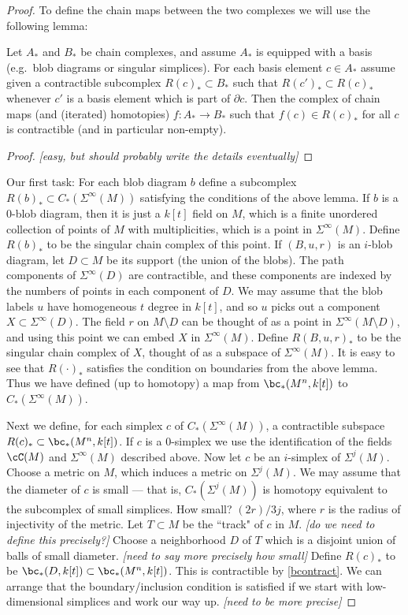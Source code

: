 \documentclass[11pt,leqno]{amsart}
\def\bd{\partial}
\def\sub{\subset}
\def\nn#1{{{\it \small [#1]}}}
\begin{document}
\begin{proof}
To define the chain maps between the two complexes we will use the following lemma:

\begin{lemma}
Let $A_*$ and $B_*$ be chain complexes, and assume $A_*$ is equipped with
a basis (e.g.\ blob diagrams or singular simplices).
For each basis element $c \in A_*$ assume given a contractible subcomplex $R(c)_* \sub B_*$
such that $R(c')_* \sub R(c)_*$ whenever $c'$ is a basis element which is part of $\bd c$.
Then the complex of chain maps (and (iterated) homotopies) $f:A_*\to B_*$ such that
$f(c) \in R(c)_*$ for all $c$ is contractible (and in particular non-empty).
\end{lemma}

\begin{proof}
\nn{easy, but should probably write the details eventually}
\end{proof}

Our first task: For each blob diagram $b$ define a subcomplex $R(b)_* \sub C_*(\Sigma^\infty(M))$
satisfying the conditions of the above lemma.
If $b$ is a 0-blob diagram, then it is just a $k[t]$ field on $M$, which is a 
finite unordered collection of points of $M$ with multiplicities, which is
a point in $\Sigma^\infty(M)$.
Define $R(b)_*$ to be the singular chain complex of this point.
If $(B, u, r)$ is an $i$-blob diagram, let $D\sub M$ be its support (the union of the blobs).
The path components of $\Sigma^\infty(D)$ are contractible, and these components are indexed 
by the numbers of points in each component of $D$.
We may assume that the blob labels $u$ have homogeneous $t$ degree in $k[t]$, and so
$u$ picks out a component $X \sub \Sigma^\infty(D)$.
The field $r$ on $M\setminus D$ can be thought of as a point in $\Sigma^\infty(M\setminus D)$,
and using this point we can embed $X$ in $\Sigma^\infty(M)$.
Define $R(B, u, r)_*$ to be the singular chain complex of $X$, thought of as a 
subspace of $\Sigma^\infty(M)$.
It is easy to see that $R(\cdot)_*$ satisfies the condition on boundaries from the above lemma.
Thus we have defined (up to homotopy) a map from 
$\bc_*(M^n, k[t])$ to $C_*(\Sigma^\infty(M))$.

Next we define, for each simplex $c$ of $C_*(\Sigma^\infty(M))$, a contractible subspace
$R(c)_* \sub \bc_*(M^n, k[t])$.
If $c$ is a 0-simplex we use the identification of the fields $\cC(M)$ and 
$\Sigma^\infty(M)$ described above.
Now let $c$ be an $i$-simplex of $\Sigma^j(M)$.
Choose a metric on $M$, which induces a metric on $\Sigma^j(M)$.
We may assume that the diameter of $c$ is small --- that is, $C_*(\Sigma^j(M))$
is homotopy equivalent to the subcomplex of small simplices.
How small?  $(2r)/3j$, where $r$ is the radius of injectivity of the metric.
Let $T\sub M$ be the ``track" of $c$ in $M$.
\nn{do we need to define this precisely?}
Choose a neighborhood $D$ of $T$ which is a disjoint union of balls of small diameter.
\nn{need to say more precisely how small}
Define $R(c)_*$ to be $\bc_*(D, k[t]) \sub \bc_*(M^n, k[t])$.
This is contractible by \ref{bcontract}.
We can arrange that the boundary/inclusion condition is satisfied if we start with
low-dimensional simplices and work our way up.
\nn{need to be more precise}


\end{proof}
\end{document}
